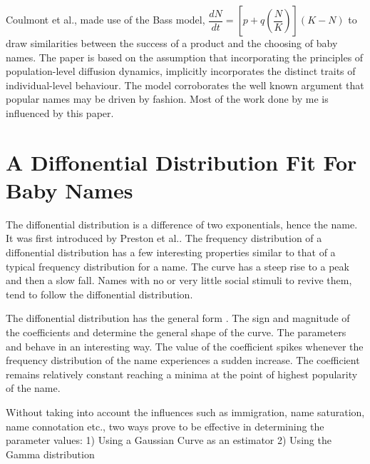 \documentclass[letterpaper,12pt]{article}
\begin{document}
Coulmont et al.\cite{3}, made use of the Bass model, 
$\dfrac{dN}{dt} = [p+q(\dfrac{N}{K})](K-N)$ to draw similarities between the success of a product and the choosing of baby names. The paper is based on the assumption that incorporating the principles of population-level diffusion dynamics, implicitly incorporates the distinct traits of individual-level behaviour. The model corroborates the well known argument that popular names may be driven by fashion. Most of the work done by me is influenced by this paper.


\section{A Diffonential Distribution Fit For Baby Names}

The diffonential distribution is a difference of two exponentials, hence the name. It was first introduced by Preston et al.\cite{6}. The frequency distribution of a diffonential distribution has a few interesting properties similar to that of a typical frequency distribution for a name.  The curve has a steep rise to a peak and then a slow fall. Names with no or very little social stimuli to revive them, tend to follow the diffonential distribution. 

The diffonential distribution has the general form . The sign and magnitude of the coefficients  and  determine the general shape of the curve. The parameters  and  behave in an interesting way. The value of the coefficient  spikes whenever the frequency distribution of the name experiences a sudden increase. The coefficient  remains relatively constant reaching a minima at the point of highest popularity of the name.

Without taking into account the influences such as immigration, name saturation, name connotation etc., two ways prove to be effective in determining the parameter values:
1) Using a Gaussian Curve as an estimator
2) Using the Gamma distribution
 
\end{document}
